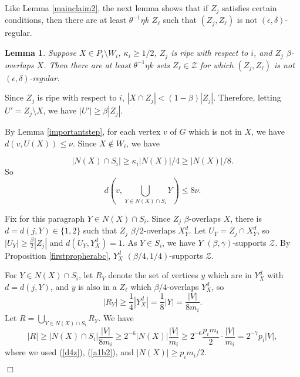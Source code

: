\documentclass[11pt]{article}
\newtheorem{lemma}{Lemma}[section]
\newenvironment{proof}
      {\medskip\noindent{\bf Proof:}\hspace{1mm}}
      {\hfill$\Box$\medskip}
\begin{document}
Like Lemma \ref{mainclaim2}, the next lemma shows that if $Z_j$ satisfies
certain conditions, then there are at least $\theta^{-1}\eta k$ $Z_{\ell}$ such
that
$(Z_j,Z_{\ell})$ is not $(\epsilon,\delta)$-regular.

\begin{lemma}\label{mainclaim1} Suppose $X \in P_i \setminus W_i$, $\kappa_i \geq 1/2$, $Z_j$ is ripe with respect to $i$, and $Z_j$
$\beta$-overlaps $X$. Then there are at least $\theta^{-1}\eta k$ sets
$Z_{\ell} \in \mathcal{Z}$ for
which $(Z_j,Z_{\ell})$ is not $(\epsilon,\delta)$-regular.
\end{lemma}
\begin{proof}
Since $Z_j$ is ripe with respect to $i$, $|X \cap Z_j| < (1 - \beta) |Z_j|$.
Therefore, letting $U' = Z_j \setminus X$, we have $|U'| \geq \beta|Z_j|$.

By Lemma \ref{importantstep}, for each vertex $v$ of $G$ which is not in $X$,
we have $d(v,U(X)) \leq \nu$. Since $X \not \in W_i$, we have 

\begin{equation}\label{a1b2}|N(X) \cap S_i|
\geq \kappa_i |N(X)|/4 \geq |N(X)|/8.
\end{equation}
So \begin{equation}\label{firstest}
d(v,\bigcup_{Y \in N(X) \cap S_i}Y) \leq 8\nu.
\end{equation}

Fix for this paragraph $Y \in N(X) \cap S_i$.
Since $Z_j$ $\beta$-overlaps $X$, there is $d=d(j,Y) \in \{1,2\}$ such that
$Z_j$ $\beta/2$-overlaps $X^d_Y$. Let $U_Y=Z_j \cap X^d_Y$, so $|U_Y| \geq
\frac{\beta}{2}|Z_j|$ and $d(U_Y,Y^d_X)=1$. As $Y \in S_i$, we have $Y$
$(\beta,\gamma)$-supports $\mathcal{Z}$. By Proposition \ref{firstpropherabc},
 $Y^d_X$ $(\beta/4,1/4)$-supports $\mathcal{Z}$.

For $Y \in N(X) \cap S_i$, let $R_Y$ denote the set of
vertices $y$ which are in $Y^d_X$ with $d=d(j,Y)$, and $y$ is also in a
$Z_{\ell}$ which
$\beta/4$-overlaps $Y^d_X$, so \begin{equation}\label{d4z}|R_Y| \geq \frac{1}{4}|Y_X^d|=\frac{1}{8}|Y|=\frac{|V|}{8m_i}.\end{equation} Let
$R=\bigcup_{Y \in N(X) \cap S_i} R_Y$. We have 
\begin{equation}\label{y25}|R| \geq |N(X) \cap S_i|\frac{|V|}{8m_i} \geq 2^{-6}|N(X)|\frac{|V|}{m_i} \geq 2^{-6}\frac{p_im_i}{2}\cdot \frac{|V|}{m_i}=2^{-7}p_i|V|,\end{equation}
where we used (\ref{d4z}), (\ref{a1b2}), and $|N(X)| \geq p_im_i/2$. 


\end{proof}
\end{document}

